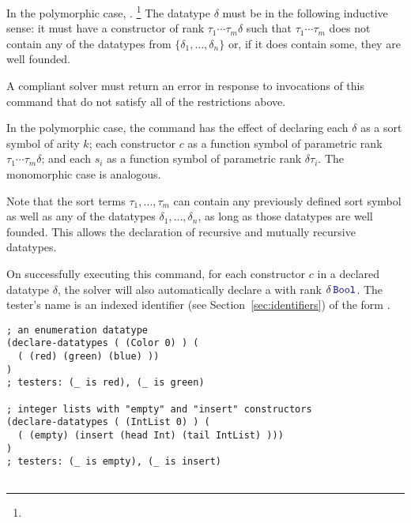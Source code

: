 \begin{description}
In the polymorphic case,
.%
\footnote{%
}
The datatype $\delta$ must be  in the following inductive sense:
it must have a constructor of rank $\tau_1\cdots\tau_m\delta$ 
such that $\tau_1\cdots\tau_m$ does not contain any of the datatypes 
from $\{\delta_1, \ldots, \delta_n\}$ or, if it does contain some, they are well founded.

A compliant solver must return an error in response to invocations of this command 
that do not satisfy all of the restrictions above.  

In the polymorphic case, 
the command has the effect of declaring each $\delta$ as a sort symbol of arity $k$;
each constructor $c$ as a function symbol of parametric rank $\tau_1\cdots\tau_m\delta$;
and each $s_i$ as a function symbol of parametric rank $\delta\tau_i$.
The monomorphic case is analogous.

Note that the sort terms $\tau_1, \ldots,\tau_m$ can contain any previously defined 
sort symbol as well as any of the datatypes $\delta_1, \ldots, \delta_n$,
as long as those datatypes are well founded.
This allows the declaration of recursive and mutually recursive datatypes.

On successfully executing this command, 
for each constructor $c$ in a declared datatype $\delta$, 
the solver will also automatically declare a 
with rank $\delta\,\ter{Bool}$.
The tester's name is an indexed identifier (see Section~\ref{sec:identifiers}) 
of the form .
\medskip

\begin{lstlisting}[linewidth=37em]
; an enumeration datatype
(declare-datatypes ( (Color 0) ) (
  ( (red) (green) (blue) ))
)
; testers: (_ is red), (_ is green)

; integer lists with "empty" and "insert" constructors
(declare-datatypes ( (IntList 0) ) (
  ( (empty) (insert (head Int) (tail IntList) )))
)
; testers: (_ is empty), (_ is insert)


\end{lstlisting}
\end{description}
